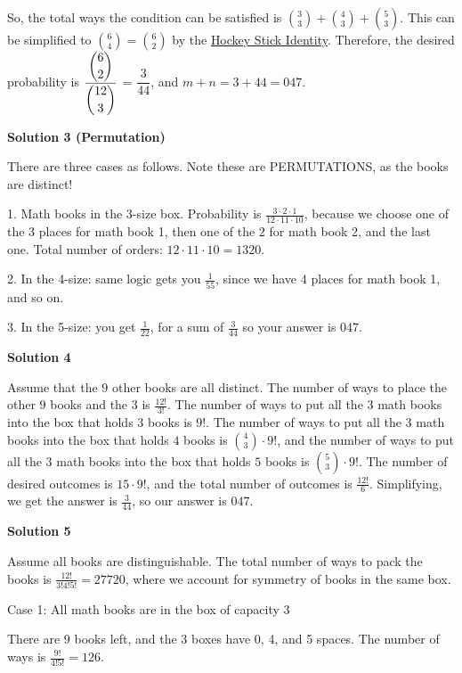 \begin{enumerate}
 So, the total ways the condition can be satisfied is $\binom{3}{3} + \binom{4}{3} + \binom{5}{3}$. This can be simplified to $\binom{6}{4} = \binom{6}{2}$ by the \href{https://artofproblemsolving.com/wiki/index.php?title=Hockey\_Stick\_Identity}{Hockey Stick Identity}. Therefore, the desired probability is $\dfrac{\dbinom{6}{2} }{\dbinom{12}{3}}$ = $\dfrac{3}{44}$, and $m+n=3+44=\boxed{047}$.

 



\textbf{Solution 3 (Permutation)}

There are three cases as follows. Note these are PERMUTATIONS, as the books are distinct!

 1. Math books in the 3-size box. Probability is $\frac{3\cdot2\cdot1}{12\cdot11\cdot10}$, because we choose one of the $3$ places for math book 1, then one of the $2$ for math book 2, and  the last one. Total number of orders: $12\cdot11\cdot10=1320$.

 2. In the 4-size: same logic gets you $\frac{1}{55}$, since we have $4$ places for math book 1, and so on.

 3. In the 5-size: you get $\frac{1}{22}$, for a sum of $\frac{3}{44}$ so your answer is $\boxed{047}$.

 



\textbf{Solution 4}

Assume that the $9$ other books are all distinct. The number of ways to place the other $9$ books and the $3$ is $\frac {12!}{3!}$. The number of ways to put all the $3$ math books into the box that holds $3$ books is $9!$. The number of ways to put all the $3$ math books into the box that holds $4$ books is $\binom {4}{3} \cdot 9!$, and the number of ways to put all the $3$ math books into the box that holds $5$ books is $\binom {5}{3} \cdot 9!$. The number of desired outcomes is $15 \cdot 9!$, and the total number of outcomes is $\frac {12!}{6}$. Simplifying, we get the answer is $\frac {3}{44}$, so our answer is $\boxed {047}$.

 



\textbf{Solution 5}

Assume all books are distinguishable. The total number of ways to pack the books is $\frac{12!}{3!4!5!}=27720$, where we account for symmetry of books in the same box. 

 
Case 1: All math books are in the box of capacity 3

 There are 9 books left, and the 3 boxes have 0, 4, and 5 spaces. The number of ways is $\frac{9!}{4!5!}=126$.


\end{enumerate}
